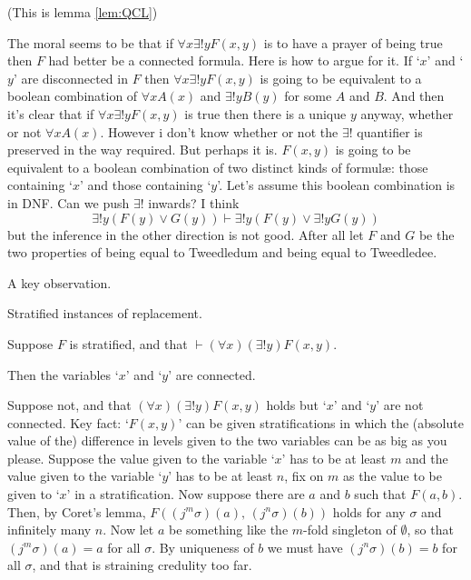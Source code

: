 \documentclass[12pt]{article}
\begin{document}
{(This is lemma \ref{lem:QCL})

The moral seems to be that if $\forall x \exists! yF(x,y)$ is to have a
prayer of being true then $F$ had better be a connected formula.  Here
is how to argue for it.  If `$x$' and `$y$' are disconnected in $F$
then $\forall x\exists!yF(x,y)$ is going to be equivalent to a boolean
combination of $\forall x A(x)$ and $\exists !yB(y)$ for some $A$ and
$B$.  And then it's clear that if $\forall x\exists!yF(x,y)$ is true
then there is a unique $y$ anyway, whether or not $\forall x A(x)$.
However i don't know whether or not the $\exists!$ quantifier is
preserved in the way required.  But perhaps it is.  $F(x,y)$ is going
to be equivalent to a boolean combination of two distinct kinds of
formul{\ae}: those containing `$x$' and those containing `$y$'. Let's
assume this boolean combination is in DNF.  Can we push $\exists!$ inwards?
I think
$$\exists! y(F(y) \vee G(y)) \vdash \exists! y(F(y) \vee \exists! yG(y))$$
but the inference in the other direction is not good.  After all let
$F$ and $G$ be the two properties of being equal to Tweedledum and
being equal to Tweedledee.

\bigskip

A key observation.

Stratified instances of replacement.
\begin{rem}\mbox{\negthinspace}
  
  Suppose $F$ is  stratified, and that $\vdash (\forall x)(\exists!y)F(x,y)$.

  Then the variables `$x$' and `$y$' are connected.\end{rem}

\Proof

Suppose not, and that $(\forall x)(\exists!y)F(x,y)$ holds but `$x$'
and `$y$' are not connected. Key fact: `$F(x,y)$' can be given
stratifications in which the (absolute value of the) difference in
levels given to the two variables can be as big as you please.
Suppose the value given to the variable `$x$' has to be at least $m$
and the value given to the variable `$y$' has to be at least $n$, fix
on $m$ as the value to be given to `$x$' in a stratification.  Now
suppose there are $a$ and $b$ such that $F(a,b)$.  Then, by Coret's
lemma, $F((j^m\sigma)(a),\, (j^n\sigma)(b))$ holds for any $\sigma$
and infinitely many $n$.  Now let $a$ be something like the $m$-fold
singleton of $\emptyset$, so that $(j^m\sigma)(a) = a$ for all
$\sigma$.  By uniqueness of $b$ we must have $(j^n\sigma)(b) = b$ for
all $\sigma$, and that is straining credulity too far.
\endproof {}

}
\end{document}
